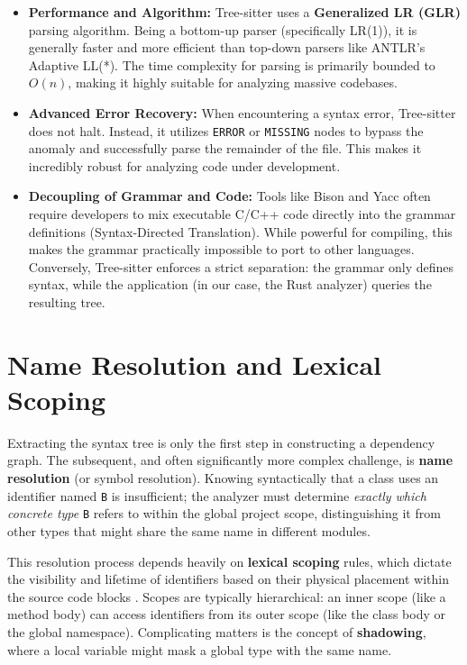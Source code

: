 \begin{itemize}
  \item \textbf{Performance and Algorithm:} Tree-sitter uses a
    \textbf{Generalized LR (GLR)} parsing algorithm. Being a
    bottom-up parser (specifically LR(1)), it is generally faster and
    more efficient than top-down parsers like ANTLR's Adaptive LL(*).
    The time complexity for parsing is primarily bounded to $O(n)$,
    making it highly suitable for analyzing massive codebases.
  \item \textbf{Advanced Error Recovery:} When encountering a syntax
    error, Tree-sitter does not halt. Instead, it utilizes
    \texttt{ERROR} or \texttt{MISSING} nodes to bypass the anomaly
    and successfully parse the remainder of the file. This makes it
    incredibly robust for analyzing code under development.
  \item \textbf{Decoupling of Grammar and Code:} Tools like Bison and
    Yacc often require developers to mix executable C/C++ code
    directly into the grammar definitions (Syntax-Directed
    Translation). While powerful for compiling, this makes the
    grammar practically impossible to port to other languages.
    Conversely, Tree-sitter enforces a strict separation: the grammar
    only defines syntax, while the application (in our case, the Rust
    analyzer) queries the resulting tree.
\end{itemize}

\section{Name Resolution and Lexical Scoping}
\label{sec:name_resolution}

Extracting the syntax tree is only the first step in constructing a
dependency graph. The subsequent, and often significantly more
complex challenge, is \textbf{name resolution} (or symbol
resolution). Knowing syntactically that a class uses an identifier
named \texttt{B} is insufficient; the analyzer must determine
\textit{exactly which concrete type} \texttt{B} refers to within the
global project scope, distinguishing it from other types that might
share the same name in different modules.

This resolution process depends heavily on \textbf{lexical scoping}
rules, which dictate the visibility and lifetime of identifiers based
on their physical placement within the source code blocks
\cite{scott_programming_2016}. Scopes are typically
hierarchical: an inner scope (like a method body) can access
identifiers from its outer scope (like the class body or the global
namespace). Complicating matters is the concept of
\textbf{shadowing}, where a local variable might mask a global type
with the same name.

